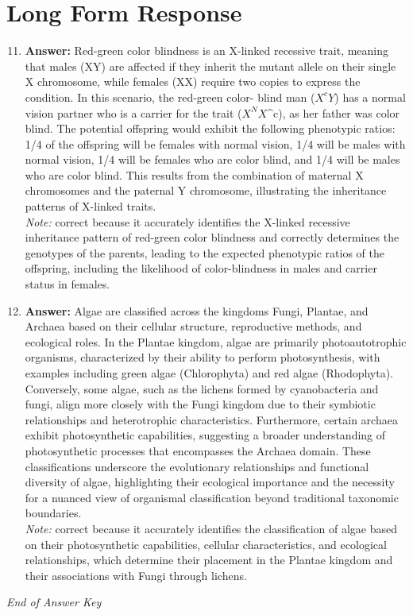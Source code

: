 \documentclass[12pt]{article}
\begin{document}
\section*{Long Form Response}
\begin{enumerate}[label=\arabic*.]
\setcounter{enumi}{10}
\item \textbf{Answer:} Red-green color blindness is an X-linked recessive trait, meaning that males (XY) are affected if they inherit the mutant allele on their single X chromosome, while females (XX) require two copies to express the condition. In this scenario, the red-green color- blind man ($X^cY$) has a normal vision partner who is a carrier for the trait ($X^NX$^c), as her father was color blind. The potential offspring would exhibit the following phenotypic ratios: 1/4 of the offspring will be females with normal vision, 1/4 will be males with normal vision, 1/4 will be females who are color blind, and 1/4 will be males who are color blind. This results from the combination of maternal X chromosomes and the paternal Y chromosome, illustrating the inheritance patterns of X-linked traits.
\\ \textit{Note:} correct because it accurately identifies the X-linked recessive inheritance pattern of red-green color blindness and correctly determines the genotypes of the parents, leading to the expected phenotypic ratios of the offspring, including the likelihood of color-blindness in males and carrier status in females.
\item \textbf{Answer:} Algae are classified across the kingdoms Fungi, Plantae, and Archaea based on their cellular structure, reproductive methods, and ecological roles. In the Plantae kingdom, algae are primarily photoautotrophic organisms, characterized by their ability to perform photosynthesis, with examples including green algae (Chlorophyta) and red algae (Rhodophyta). Conversely, some algae, such as the lichens formed by cyanobacteria and fungi, align more closely with the Fungi kingdom due to their symbiotic relationships and heterotrophic characteristics. Furthermore, certain archaea exhibit photosynthetic capabilities, suggesting a broader understanding of photosynthetic processes that encompasses the Archaea domain. These classifications underscore the evolutionary relationships and functional diversity of algae, highlighting their ecological importance and the necessity for a nuanced view of organismal classification beyond traditional taxonomic boundaries.
\\ \textit{Note:} correct because it accurately identifies the classification of algae based on their photosynthetic capabilities, cellular characteristics, and ecological relationships, which determine their placement in the Plantae kingdom and their associations with Fungi through lichens.
\end{enumerate}

\vfill
\noindent\textit{End of Answer Key}
\end{document}
